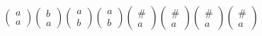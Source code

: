 \documentclass[a4paper, 14pt]{article}
\begin{document}
$$
\begin{pmatrix}
	a\\
	a
\end{pmatrix}
\begin{pmatrix}
	b\\
	a
\end{pmatrix}
\begin{pmatrix}
	a\\
	b	
\end{pmatrix}
\begin{pmatrix}
	a\\
	b	
\end{pmatrix}
\begin{pmatrix}
	\#\\
	a	
\end{pmatrix}
\begin{pmatrix}
	\#\\
	a	
\end{pmatrix}
\begin{pmatrix}
	\#\\
	a	
\end{pmatrix}
\begin{pmatrix}
	\#\\
	a	
\end{pmatrix}
$$
\end{document}
